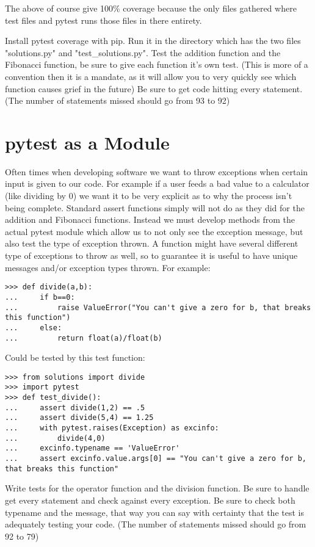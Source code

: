 The above of course give 100\% coverage because the only files gathered where test files and pytest runs those files in there entirety.

\begin{problem}
Install pytest coverage with pip.
Run it in the directory which has the two files "solutions.py" and "test\_solutions.py".
Test the addition function and the Fibonacci function, be sure to give each function it's own test. (This is more of a convention then it is a mandate,
as it will allow you to very quickly see which function causes grief in the future) Be sure to get code hitting every statement.
(The number of statements missed should go from 93 to 92)
\end{problem}

\section*{pytest as a Module}

Often times when developing software we want to throw exceptions when certain input is given to our code.
For example if a user feeds a bad value to a calculator (like dividing by 0) we want it to be very explicit as to why the process isn't being complete.
Standard assert functions simply will not do as they did for the addition and Fibonacci functions.
Instead we must develop methods from the actual pytest module which allow us to not only see the exception message, but also test the type of exception thrown.
A function might have several different type of exceptions to throw as well, so to guarantee it is useful to have unique messages and/or exception types thrown.
For example:

\begin{lstlisting}
>>> def divide(a,b):
...     if b==0:
...         raise ValueError("You can't give a zero for b, that breaks this function")
...     else:
...         return float(a)/float(b)
\end{lstlisting}
Could be tested by this test function:
\begin{lstlisting}
>>> from solutions import divide
>>> import pytest
>>> def test_divide():
...     assert divide(1,2) == .5
...     assert divide(5,4) == 1.25
...     with pytest.raises(Exception) as excinfo:
...         divide(4,0)
...     excinfo.typename == 'ValueError'
...     assert excinfo.value.args[0] == "You can't give a zero for b, that breaks this function"
\end{lstlisting}

\begin{problem}
Write tests for the operator function and the division function. Be sure to handle get every statement and check against every exception.
Be sure to check both typename and the message, that way you can say with certainty that the test is adequately testing your code.
(The number of statements missed should go from 92 to 79)
\end{problem}

